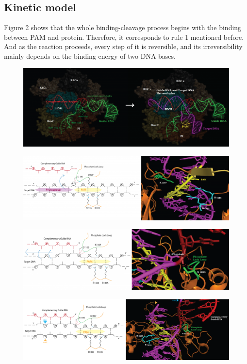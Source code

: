 \documentclass[a4paper,10pt]{article}
\begin{document}
	\subsection{Kinetic model}
Figure 2 shows that the whole binding-cleavage process begins with the binding between PAM and protein. Therefore, it corresponds to rule 1 mentioned before. And as the reaction proceeds, every step of it is reversible, and its irreversibility mainly depends on the binding energy of two DNA bases.
	\begin{figure}
		\centering
		\includegraphics[width=0.7\linewidth]{2}
		\caption{}
		\label{fig:2}
	\end{figure}
	\begin{figure}
		\centering
		\includegraphics[width=0.7\linewidth]{3}
		\caption{}
		\label{fig:3}
	\end{figure}
	\begin{figure}
		\centering
		\includegraphics[width=0.7\linewidth]{4}
		\caption{}
		\label{fig:4}
	\end{figure}
	\begin{figure}
		\centering
		\includegraphics[width=0.7\linewidth]{5}
		\caption{}
		\label{fig:5}
	\end{figure}
	
\end{document}
